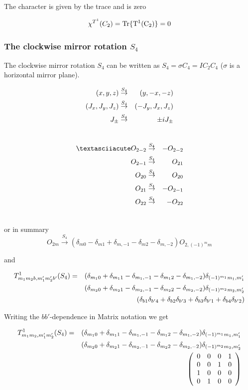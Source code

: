 The character is given by the trace and is zero

\begin{equation}
\chi^{T^1}(C_2)=\rm Tr \{ T^1(C_2) \}=0
\end{equation}

\subsubsection{The clockwise mirror rotation $S_4$}

 The clockwise mirror rotation $S_4$ can be written as $S_4=\sigma C_4=IC_2C_4$ ($\sigma$ is 
a horizontal mirror plane).

\begin{eqnarray}
(x,y,z) &\stackrel{S_4}{\rightarrow}& (y,-x,-z) \\ \nonumber
(J_x,J_y,J_z) &\stackrel{S_4}{\rightarrow}&  (-J_y,J_x,J_z) \\ \nonumber
J_\pm &\stackrel{S_4}{\rightarrow}& \pm iJ_\pm \\ \nonumber
\end{eqnarray}


\begin{eqnarray}
´O_{2-2}&\stackrel{S_4}{\rightarrow}&-O_{2-2} \nn
O_{2-1}&\stackrel{S_4}{\rightarrow}&O_{21} \nn
O_{20}&\stackrel{S_4}{\rightarrow}&O_{20} \nn
O_{21}&\stackrel{S_4}{\rightarrow}&-O_{2-1}\nn
O_{22}&\stackrel{S_4}{\rightarrow}&-O_{22}\nn
\end{eqnarray}

or in summary
\begin{equation}
O_{2m}\stackrel{S_4}{\rightarrow} 
(\delta_{m0}-\delta_{m1}+\delta_{m,-1}-\delta_{m2}-\delta_{m,-2})
 O_{2,(-1)^mm} 
\end{equation}

and 

\begin{eqnarray}
T^1_{m_1m_2b,m'_1m'_2b'}(S_4)&=&
(\delta_{m_10}+\delta_{m_11}-\delta_{m_1,-1}-\delta_{m_12}-\delta_{m_1,-2})
\delta_{(-1)^{m_1}m_1,m'_1} \\ \nonumber
&&
(\delta_{m_20}+\delta_{m_21}-\delta_{m_2,-1}-\delta_{m_22}-\delta_{m_2,-2})
\delta_{(-1)^{m_2}m_2,m'_2} \\ \nonumber
&&(\delta_{b1}\delta_{b'4}+\delta_{b2}\delta_{b'3}+\delta_{b3}\delta_{b'1}+\delta_{b4}\delta_{b'2})
\end{eqnarray}

Writing the $bb'$-dependence in Matrix notation we get

\begin{eqnarray}\label{S4}
T^1_{m_1m_2,m'_1m'_2}(S_4)&=&(\delta_{m_10}+\delta_{m_11}-\delta_{m_1,-1}-\delta_{m_12}-\delta_{m_1,-2})
\delta_{(-1)^{m_1}m_1,m'_1} \\ \nonumber
&&
(\delta_{m_20}+\delta_{m_21}-\delta_{m_2,-1}-\delta_{m_22}-\delta_{m_2,-2})
\delta_{(-1)^{m_2}m_2,m'_2} \\ \nonumber
&&\left (
\begin{array}{cccc}
0 & 0 & 0 & 1 \\
0 & 0 & 1 & 0 \\
1 & 0 & 0 & 0 \\
0 & 1 & 0 & 0 
\end{array} \right )
\end{eqnarray}

